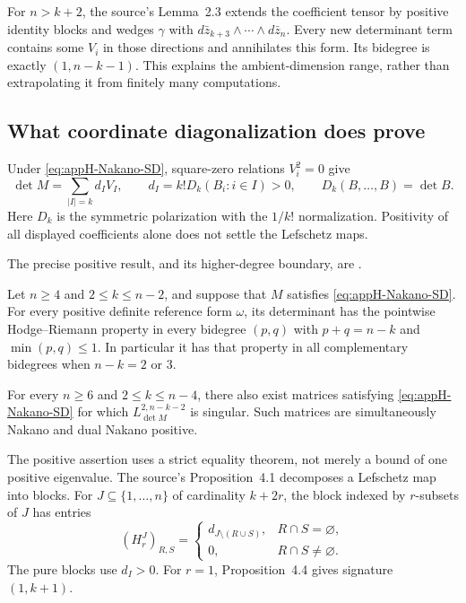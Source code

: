 For $n>k+2$, the source's Lemma~2.3 extends the coefficient
tensor by positive identity blocks and wedges $\gamma$ with
$d\bar z_{k+3}\wedge\cdots\wedge d\bar z_n$.
Every new determinant term contains some $V_i$ in those
directions and annihilates this form. Its bidegree is exactly
$(1,n-k-1)$. This explains the ambient-dimension range,
rather than extrapolating it from finitely many computations.

\subsection{What coordinate diagonalization does prove}
\label{sec:appH-Nakano-SD-degree-one}

Under \eqref{eq:appH-Nakano-SD}, square-zero relations
$V_i^2=0$ give
\begin{equation*}
 \det M=\sum_{|I|=k}d_I V_I,\qquad
 d_I=k!D_k(B_i:i\in I)>0,
 \qquad D_k(B,\ldots,B)=\det B.
 \tag{H.91}\label{eq:appH-Nakano-mixed-coefficients}
\end{equation*}
Here $D_k$ is the symmetric polarization with the $1/k!$
normalization. Positivity of all displayed coefficients alone
does not settle the Lefschetz maps.

The precise positive result, and its higher-degree boundary,
are \cite[Theorems~B--C]{Chen26NakanoDeterminantsV2}.

\begin{theorem}
\label{thm:appH-Nakano-SD-boundary}
Let $n\geq4$ and $2\leq k\leq n-2$, and suppose that
$M$ satisfies \eqref{eq:appH-Nakano-SD}.
For every positive definite reference form $\omega$, its
determinant has the pointwise Hodge--Riemann property in every
bidegree $(p,q)$ with $p+q=n-k$ and $\min(p,q)\leq1$.
In particular it has that property in all complementary
bidegrees when $n-k=2$ or $3$.

For every $n\geq6$ and $2\leq k\leq n-4$, there also exist
matrices satisfying \eqref{eq:appH-Nakano-SD} for which
$L^{2,n-k-2}_{\det M}$ is singular. Such matrices are
simultaneously Nakano and dual Nakano positive.
\end{theorem}

The positive assertion uses a strict equality theorem, not
merely a bound of one positive eigenvalue. The source's
Proposition~4.1 decomposes a Lefschetz map into blocks. For
$J\subseteq\{1,\ldots,n\}$ of cardinality $k+2r$, the
block indexed by $r$-subsets of $J$ has entries
\begin{equation*}
 (H_r^J)_{R,S}=\begin{cases}
 d_{J\setminus(R\cup S)},&R\cap S=\varnothing,\\
 0,&R\cap S\ne\varnothing.
 \end{cases}
 \tag{H.92}\label{eq:appH-Nakano-block-matrix}
\end{equation*}
The pure blocks use $d_I>0$. For $r=1$, Proposition~4.4
gives signature $(1,k+1)$.

